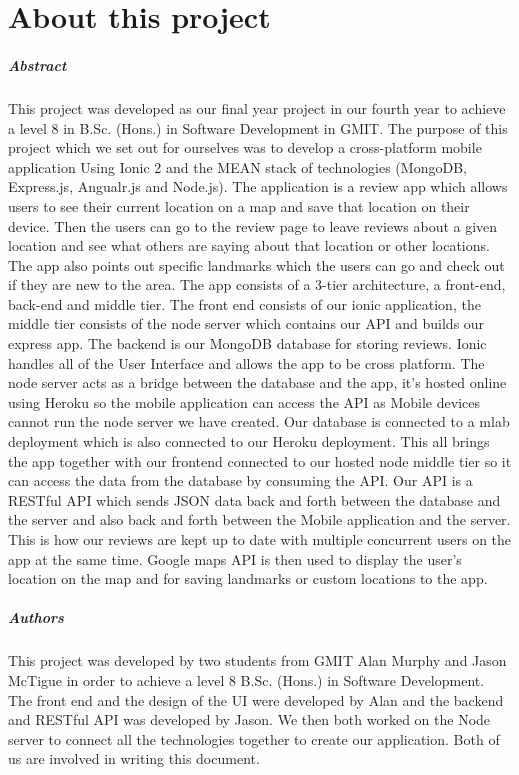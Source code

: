 
\chapter*{About this project}
\paragraph{Abstract}
This project was developed as our final year project in our fourth year to achieve a level 8 in B.Sc. (Hons.) in Software Development in GMIT. The purpose of this project which we set out for ourselves was to develop a cross-platform mobile application Using Ionic 2 and the MEAN stack of technologies (MongoDB, Express.js, Angualr.js and Node.js). The application is a review app which allows users to see their current location on a map and save that location on their device. Then the users can go to the review page to leave reviews about a given location and see what others are saying about that location or other locations. The app also points out specific landmarks which the users can go and check out if they are new to the area. The app consists of a 3-tier architecture, a front-end, back-end and middle tier. The front end consists of our ionic application, the middle tier consists of the node server which contains our API and builds our express app. The backend is our MongoDB database for storing reviews. Ionic handles all of the User Interface and allows the app to be cross platform. The node server acts as a bridge between the database and the app, it’s hosted online using Heroku so the mobile application can access the API as Mobile devices cannot run the node server we have created. Our database is connected to a mlab deployment which is also connected to our Heroku deployment. This all brings the app together with our frontend connected to our hosted node middle tier so it can access the data from the database by consuming the API. Our API is a RESTful API which sends JSON data back and forth between the database and the server and also back and forth between the Mobile application and the server. This is how our reviews are kept up to date with multiple concurrent users on the app at the same time. Google maps API is then used to display the user’s location on the map and for saving landmarks or custom locations to the app.

\paragraph{Authors}
This project was developed by two students from GMIT Alan Murphy and Jason McTigue in order to achieve a level 8 B.Sc. (Hons.) in Software Development. The front end and the design of the UI were developed by Alan and the backend and RESTful API was developed by Jason. We then both worked on the Node server to connect all the technologies together to create our application. Both of us are involved in writing this document.

